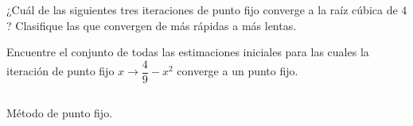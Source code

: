 \begin{questions}

    \question

    ¿Cuál de las siguientes tres iteraciones de punto fijo converge a
    la raíz cúbica de $4$?
    Clasifique las que convergen de más rápidas a más lentas.

    \begin{multicols}{3}
    \end{multicols}

    \question

    Encuentre el conjunto de todas las estimaciones iniciales para
    las cuales la iteración de punto fijo
    $x\rightarrow\dfrac{4}{9}-x^{2}$ converge a un punto fijo.

    \begin{listing}[ht!]
        \tiny
        \centering
        \inputminted[linenos,highlightlines={7-15}]{octave}{fpi.m}
        \caption{Método de punto fijo.}
    \end{listing}


\end{questions}
